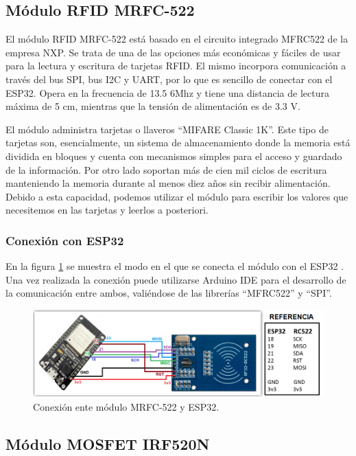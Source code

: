 \subsection{Módulo RFID MRFC-522}

El módulo RFID MRFC-522 está basado en el circuito integrado MFRC522 de la empresa NXP. Se trata de una de las opciones más económicas y fáciles de usar para la lectura y escritura de tarjetas RFID. El mismo incorpora comunicación a través del bus SPI, bus I2C y UART, por lo que es sencillo de conectar con el ESP32. Opera en la frecuencia de 13.5 6Mhz y tiene una distancia de lectura máxima de 5 cm, mientras que la tensión de alimentación es de 3.3 V. 

El módulo administra tarjetas o llaveros ``MIFARE Classic 1K''. Este tipo de tarjetas son, esencialmente, un sistema de almacenamiento donde la memoria está dividida en bloques y cuenta con mecanismos simples para el acceso y guardado de la información. Por otro lado soportan más de cien mil ciclos de escritura manteniendo la memoria durante al menos diez años sin recibir alimentación. Debido a esta capacidad, podemos utilizar el módulo para escribir los valores que necesitemos en las tarjetas y leerlos a posteriori. 

\subsubsection{Conexión con ESP32}

En la figura \ref{fig:mrf522} se muestra el modo en el que se conecta el módulo con el ESP32 \citep{WEBSITE:MRF522}. Una vez realizada la conexión puede utilizarse Arduino IDE para el desarrollo de la comunicación entre ambos, valiéndose de las librerías ``MFRC522'' y ``SPI''.

\begin{figure}[ht]
	\centering
	\includegraphics[width=1\textwidth]{./Figures/mrf522.png}
	\caption{Conexión ente módulo MRFC-522 y ESP32.}
	\label{fig:mrf522}
\end{figure} 


\subsection{Módulo MOSFET IRF520N}

